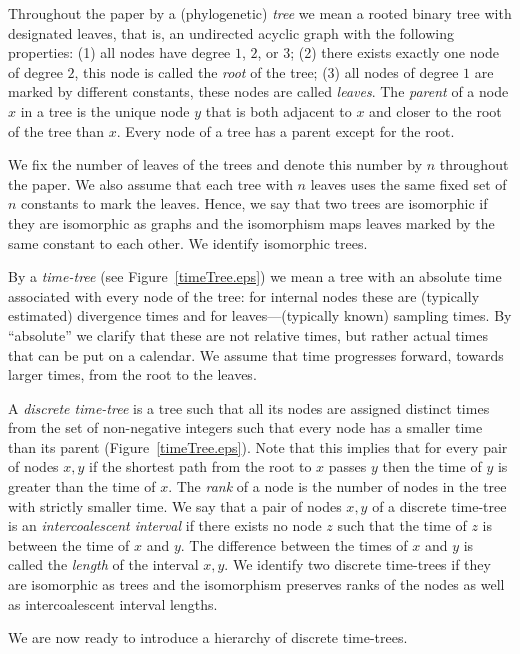 \documentclass{amsart}
\theoremstyle{definition}
\begin{document}
Throughout the paper by a (phylogenetic) \emph{tree} we mean a rooted binary tree with designated leaves, that is, an undirected acyclic graph with the following properties:
(1) all nodes have degree $1$, $2$, or $3$; (2) there exists exactly one node of degree $2$, this node is called the \emph{root} of the tree; (3) all nodes of degree $1$ are marked by different constants, these nodes are called \emph{leaves}.
The \emph{parent} of a node $x$ in a tree is the unique node $y$ that is both adjacent to $x$ and closer to the root of the tree than $x$.
Every node of a tree has a parent except for the root.

We fix the number of leaves of the trees and denote this number by $n$ throughout the paper.
We also assume that each tree with $n$ leaves uses the same fixed set of $n$ constants to mark the leaves.
Hence, we say that two trees are isomorphic if they are isomorphic as graphs and the isomorphism maps leaves marked by the same constant to each other.
We identify isomorphic trees.

By a \emph{time-tree} (see Figure~\ref{timeTree.eps}) we mean a tree with an absolute time associated with every node of the tree: for internal nodes these are (typically estimated) divergence times and for leaves---(typically known) sampling times.
By ``absolute'' we clarify that these are not relative times, but rather actual times that can be put on a calendar.
We assume that time progresses forward, towards larger times, from the root to the leaves.

A \emph{discrete time-tree} is a tree such that all its nodes are assigned distinct times from the set of non-negative integers such that every node has a smaller time than its parent (Figure~\ref{timeTree.eps}).
Note that this implies that for every pair of nodes $x,y$ if the shortest path from the root to $x$ passes $y$ then the time of $y$ is greater than the time of $x$.
The \emph{rank} of a node is the number of nodes in the tree with strictly smaller time.
We say that a pair of nodes $x,y$ of a discrete time-tree is an \emph{intercoalescent interval} if there exists no node $z$ such that the time of $z$ is between the time of $x$ and $y$.
The difference between the times of $x$ and $y$ is called the \emph{length} of the interval $x,y$.
We identify two discrete time-trees if they are isomorphic as trees and the isomorphism preserves ranks of the nodes as well as intercoalescent interval lengths.

We are now ready to introduce a hierarchy of discrete time-trees.
\end{document}
